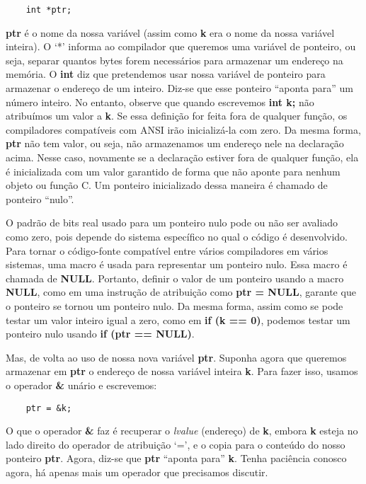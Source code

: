 \begin{lstlisting}
	int *ptr;
\end{lstlisting}

\textbf{ptr} é o nome da nossa variável (assim como \textbf{k} era o nome da nossa variável inteira). O `*' informa ao compilador que queremos uma variável de ponteiro, ou seja, separar quantos bytes forem necessários para armazenar um endereço na memória. O \textbf{int} diz que pretendemos usar nossa variável de ponteiro para armazenar o endereço de um inteiro. Diz-se que esse ponteiro ``aponta para'' um número inteiro. No entanto, observe que quando escrevemos \textbf{int k;} não atribuímos um valor a \textbf{k}. Se essa definição for feita fora de qualquer função, os compiladores compatíveis com ANSI irão inicializá-la com zero. Da mesma forma, \textbf{ptr} não tem valor, ou seja, não armazenamos um endereço nele na declaração acima. Nesse caso, novamente se a declaração estiver fora de qualquer função, ela é inicializada com um valor garantido de forma que não aponte para nenhum objeto ou função C. Um ponteiro inicializado dessa maneira é chamado de ponteiro ``nulo''.

O padrão de bits real usado para um ponteiro nulo pode ou não ser avaliado como zero, pois depende do sistema específico no qual o código é desenvolvido. Para tornar o código-fonte compatível entre vários compiladores em vários sistemas, uma macro é usada para representar um ponteiro nulo. Essa macro é chamada de \textbf{NULL}. Portanto, definir o valor de um ponteiro usando a macro \textbf{NULL}, como em uma instrução de atribuição como \textbf{ptr = NULL}, garante que o ponteiro se tornou um ponteiro nulo. Da mesma forma, assim como se pode testar um valor inteiro igual a zero, como em \textbf{if (k == 0)}, podemos testar um ponteiro nulo usando \textbf{if (ptr == NULL)}.

Mas, de volta ao uso de nossa nova variável \textbf{ptr}. Suponha agora que queremos armazenar em \textbf{ptr} o endereço de nossa variável inteira \textbf{k}. Para fazer isso, usamos o operador \textbf{\&} unário e escrevemos:

\begin{lstlisting}
	ptr = &k;
\end{lstlisting}

O que o operador \textbf{\&} faz é recuperar o \textit{lvalue} (endereço) de \textbf{k}, embora \textbf{k} esteja no lado direito do operador de atribuição `=', e o copia para o conteúdo do nosso ponteiro \textbf{ptr}. Agora, diz-se que \textbf{ptr} ``aponta para'' \textbf{k}. Tenha paciência conosco agora, há apenas mais um operador que precisamos discutir.

